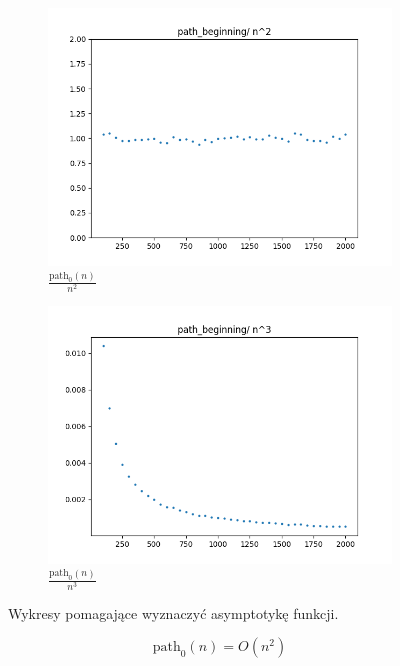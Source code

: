 \documentclass{article}
\begin{document}
\begin{figure}[H]
\begin{subfigure}{.475\textwidth}
    \centering
    \includegraphics[width=\textwidth]{path_beginning_nn.png}
    \caption{\( \frac{\text{path}_0(n)}{n^2} \)}
    \label{fig:path_beginning_nn}
  \end{subfigure}%
  \begin{subfigure}{.475\textwidth}
    \centering
    \includegraphics[width=\textwidth]{path_beginning_nnn.png}
    \caption{\( \frac{\text{path}_0(n)}{n^3} \)}
    \label{fig:path_beginning_nnn}
  \end{subfigure}%
  \caption{Wykresy pomagające wyznaczyć asymptotykę funkcji.}
\end{figure}
\[\text{path}_0(n)=O(n^2)\]
\end{document}
